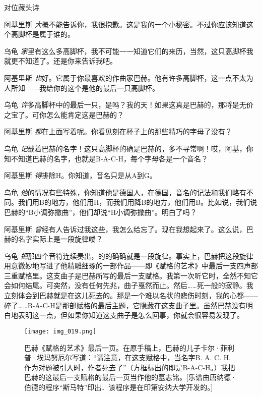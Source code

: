 \begin{dialog}{对位藏头诗}
\begin{dialogue}
\item[阿基里斯]\emph{大}概不能告诉你，我很抱歉。这是我的一个小秘密。不过你应该知道这个高脚杯是属于谁的。

\item[乌龟]\emph{家}里有这么多高脚杯，我不可能一一知道它们的来历，当然，这只高脚杯我就更不知道了。还是你来告诉我吧。

\item[阿基里斯]\emph{也}好。它属于你最喜欢的作曲家巴赫。他有许多高脚杯，这一点不太为人所知——我给你的这个是他的最后一只高脚杯。

\item[乌龟]\emph{许}多高脚杯中的最后一只，是吗？我的天！如果这真是巴赫的，那将是无价之宝了。可你怎么能肯定这是巴赫的？

\item[阿基里斯]\emph{都}在上面写着呢。你看见刻在杯子上的那些精巧的字母了没有？

\item[乌龟]\emph{记}载着巴赫的名字！这只高脚杯的确是巴赫的，多不寻常啊！哎，阿基，你知不知道巴赫的名字，也就是B-A-C-H，每个字母各是一个音名？

\item[阿基里斯]\emph{得}排除H。你知道，音名只是从A到G。

\item[乌龟]\emph{他}的情况有些特殊，你知道他是德国人，在德国，音名的记法和我们略有不同。我们用B的地方，他们用H，而我们用降B的地方，他们用B。比如说，我们说巴赫的“B小调弥撒曲”，他们却说“H小调弥撒曲”。明白了吗？

\item[阿基里斯]\emph{曾}经有人告诉过我这些，我怎么给忘了。现在我想起来了。这么说，巴赫的名字实际上是一段旋律喽？

\item[乌龟]\emph{把}那四个音符连续奏出，的的确确就是一段旋律。事实上，巴赫把这段旋律用意微妙地写进了他精雕细琢的一部作品——即《赋格的艺术》中最后一支四声部三重赋格里。这支曲子是巴赫所写的最后一支赋格。我第一次听它时，全然不知它会如何结尾。可突然，没有任何先兆，曲子戛然而止。然后……死一般的寂静。我立刻体会到巴赫就是在这儿死去的。那是一个难以名状的悲伤时刻，我的心都——碎了……B-A-C-H是那部赋格的最后主题，它隐藏在这支曲子里。虽然巴赫没有明白地表明这一点，但如果你知道这支曲子是怎么回事，你就会很容易发现了。

\begin{figure}
\texttt{[image: img\_019.png]}
\caption[巴赫《赋格的艺术》的最后一页。]
  {巴赫《赋格的艺术》最后一页。在原手稿上，巴赫的儿子卡尔·菲利普·埃玛努厄尔写道：“请注意，在这支赋格中，当名字B. A. C. H.作为对题被引入时，作者死去了”（方框标出的即是B-A-C-H。）我把巴赫的这最后一支赋格的最后一页当作他的墓志铭。[乐谱由唐纳德·伯德的程序“斯马特”印出．该程序是在印第安纳大学开发的。] }
\end{figure}


\end{dialogue}
\end{dialog}
